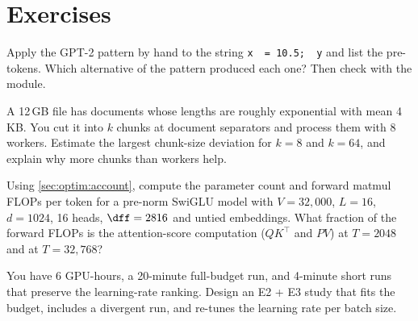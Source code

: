\section{Exercises}

\begin{exercise}
Apply the GPT-2 pattern by hand to the string \verb*|x  = 10.5;  y| and list the pre-tokens.
Which alternative of the pattern produced each one? Then check with the  module.
\end{exercise}

\begin{exercise}
A 12\,GB file has documents whose lengths are roughly exponential with mean 4\,KB. You cut it
into $k$ chunks at document separators and process them with 8 workers. Estimate the largest
chunk-size deviation for $k=8$ and $k=64$, and explain why more chunks than workers help.
\end{exercise}

\begin{exercise}
Using \cref{sec:optim:account}, compute the parameter count and forward matmul FLOPs per token
for a pre-norm SwiGLU model with $V=32{,}000$, $L=16$, $d=1024$, 16 heads, $\dff=2816$ and untied
embeddings. What fraction of the forward FLOPs is the attention-score computation ($QK^\top$ and
$PV$) at $T=2048$ and at $T=32{,}768$?
\end{exercise}

\begin{exercise}
You have 6 GPU-hours, a 20-minute full-budget run, and 4-minute short runs that preserve the
learning-rate ranking. Design an E2 + E3 study that fits the budget, includes a divergent run,
and re-tunes the learning rate per batch size.
\end{exercise}
